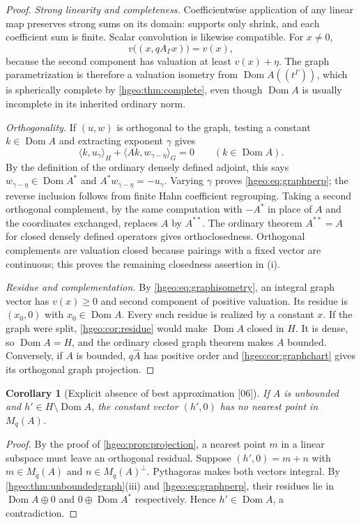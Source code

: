 \documentclass[11pt,letterpaper]{article}
\numberwithin{equation}{section}
\newtheorem{corollary}[corollary]{Corollary}
\theoremstyle{definition}
\theoremstyle{remark}
\newcommand{\Dom}{\operatorname{Dom}}
\newcommand{\ip}[2]{\langle #1,#2\rangle}
\newcommand{\src}[1]{\textup{\textsf{\small[#1]}}}
\begin{document}
\begin{proof}
\emph{Strong linearity and completeness.} Coefficientwise application of
any linear map preserves strong sums on its domain: supports only shrink,
and each coefficient sum is finite. Scalar convolution is likewise
compatible. For $x\ne0$,
\begin{equation}\label{hgeo:eq:graphisometry}
 v\bigl((x,qA_\Gamma x)\bigr)=v(x),
\end{equation}
because the second component has valuation at least $v(x)+\eta$.
The graph parametrization is therefore a valuation isometry from
$\Dom A((t^\Gamma))$, which is spherically complete by
\cref{hgeo:thm:complete}, even though $\Dom A$ is usually
incomplete in its inherited ordinary norm.

\emph{Orthogonality.} If $(u,w)$ is orthogonal to the graph, testing a
constant $k\in\Dom A$ and extracting exponent $\gamma$ gives
\[
 \ip{k}{u_\gamma}_H+\ip{Ak}{w_{\gamma-\eta}}_G=0
 \qquad(k\in\Dom A).
\]
By the definition of the ordinary densely defined adjoint, this says
$w_{\gamma-\eta}\in\Dom A^*$ and
$A^*w_{\gamma-\eta}=-u_\gamma$. Varying $\gamma$ proves
\eqref{hgeo:eq:graphperp}; the reverse inclusion follows from finite Hahn
coefficient regrouping. Taking a second orthogonal complement, by the same
computation with $-A^*$ in place of $A$ and the coordinates exchanged,
replaces $A$ by $A^{**}$. The ordinary theorem $A^{**}=A$ for closed densely
defined operators \cite{Kato} gives orthoclosedness. Orthogonal complements
are valuation closed because pairings with a fixed vector are continuous;
this proves the remaining closedness assertion in (i).

\emph{Residue and complementation.} By \eqref{hgeo:eq:graphisometry}, an
integral graph vector has $v(x)\ge0$ and second component of positive
valuation. Its residue is $(x_0,0)$ with $x_0\in\Dom A$. Every such residue
is realized by a constant $x$. If the graph were split,
\cref{hgeo:cor:residue} would make $\Dom A$ closed in $H$. It is dense,
so $\Dom A=H$, and the ordinary closed graph theorem makes $A$ bounded.
Conversely, if $A$ is bounded, $q\widehat A$ has positive order and
\cref{hgeo:cor:graphchart} gives its orthogonal graph projection.
\end{proof}

\begin{corollary}[Explicit absence of best approximation \src{06}]
\label{hgeo:cor:best}
If $A$ is unbounded and $h'\in H\setminus\Dom A$, the constant vector
$(h',0)$ has no nearest point in $M_q(A)$.
\end{corollary}
\begin{proof}
By the proof of \cref{hgeo:prop:projection}, a nearest point $m$ in a linear
subspace must leave an orthogonal residual. Suppose $(h',0)=m+n$ with
$m\in M_q(A)$ and $n\in M_q(A)^\perp$. Pythagoras makes both vectors integral.
By \cref{hgeo:thm:unboundedgraph}(iii) and \eqref{hgeo:eq:graphperp}, their
residues lie in $\Dom A\oplus0$ and $0\oplus\Dom A^*$ respectively. Hence
$h'\in\Dom A$, a contradiction.
\end{proof}
\end{document}
